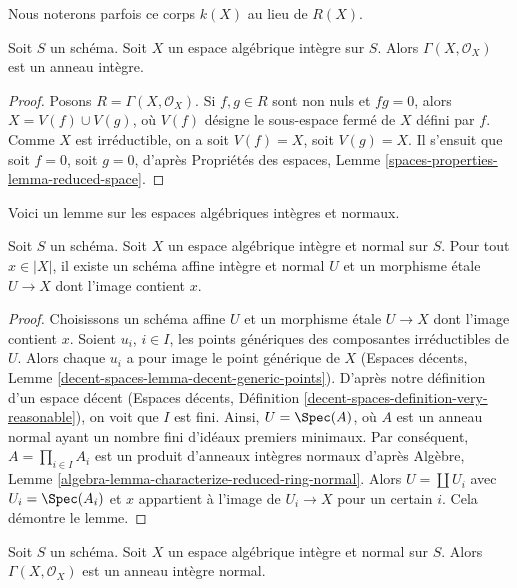 \noindent
Nous noterons parfois ce corps $k(X)$ au lieu de $R(X)$.

\begin{lemma}
\label{lemma-integral-sections}
Soit $S$ un schéma. Soit $X$ un espace algébrique intègre sur $S$.
Alors $\Gamma(X, \mathcal{O}_X)$ est un anneau intègre.
\end{lemma}

\begin{proof}
Posons $R = \Gamma(X, \mathcal{O}_X)$. Si $f, g \in R$ sont non nuls et
$fg = 0$, alors $X = V(f) \cup V(g)$, où $V(f)$ désigne le sous-espace fermé
de $X$ défini par $f$. Comme $X$ est irréductible, on a soit
$V(f) = X$, soit $V(g) = X$. Il s'ensuit que soit $f = 0$, soit $g = 0$, d'après
Propriétés des espaces, Lemme \ref{spaces-properties-lemma-reduced-space}.
\end{proof}

\noindent
Voici un lemme sur les espaces algébriques intègres et normaux.

\begin{lemma}
\label{lemma-normal-integral-cover-by-affines}
Soit $S$ un schéma. Soit $X$ un espace algébrique intègre et normal sur $S$.
Pour tout $x \in |X|$, il existe un schéma affine intègre et normal $U$
et un morphisme \'etale $U \to X$ dont l'image contient $x$.
\end{lemma}

\begin{proof}
Choisissons un schéma affine $U$ et un morphisme \'etale $U \to X$ dont
l'image contient $x$. Soient $u_i$, $i \in I$, les points génériques des
composantes irréductibles de $U$. Alors chaque $u_i$ a pour image le point générique de $X$
(Espaces décents, Lemme \ref{decent-spaces-lemma-decent-generic-points}). D'après
notre définition d'un espace décent
(Espaces décents, Définition \ref{decent-spaces-definition-very-reasonable}),
on voit que $I$ est fini. Ainsi, $U = \Spec(A)$, où $A$ est un anneau normal
ayant un nombre fini d'idéaux premiers minimaux.
Par conséquent, $A = \prod_{i \in I} A_i$ est un produit d'anneaux intègres normaux d'après
Algèbre, Lemme \ref{algebra-lemma-characterize-reduced-ring-normal}.
Alors $U = \coprod U_i$ avec $U_i = \Spec(A_i)$ et $x$ appartient à l'image de
$U_i \to X$ pour un certain $i$. Cela démontre le lemme.
\end{proof}

\begin{lemma}
\label{lemma-normal-integral-sections}
Soit $S$ un schéma. Soit $X$ un espace algébrique intègre et normal sur $S$.
Alors $\Gamma(X, \mathcal{O}_X)$ est un anneau intègre normal.
\end{lemma}

